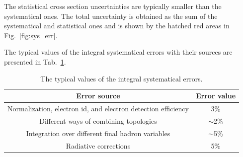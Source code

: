 The statistical cross section uncertainties are typically smaller than the systematical ones. The total uncertainty is obtained as the sum of the systematical and statistical ones and is shown by the hatched red areas in Fig.~\ref{fig:sys_err}.
 
The typical values of the integral systematical errors with their sources are presented in Tab.~\ref{tab:sys_err}. 
 
\begin{table}[htp]
\centering 

\begin{tabular}{|c|c|}

\hline
Error source & Error value\\ \hline
Normalization, electron id, and
 electron detection efficiency & 3\% \\ \hline
Different ways of combining topologies & $\sim$2\%\\ \hline 
Integration over different final hadron variables & $\sim$5\%\\ \hline 
Radiative corrections & 5\% \\ \hline 
\end{tabular}
\caption{\small The typical values of the integral systematical errors. \label{tab:sys_err}}
\end{table}  

